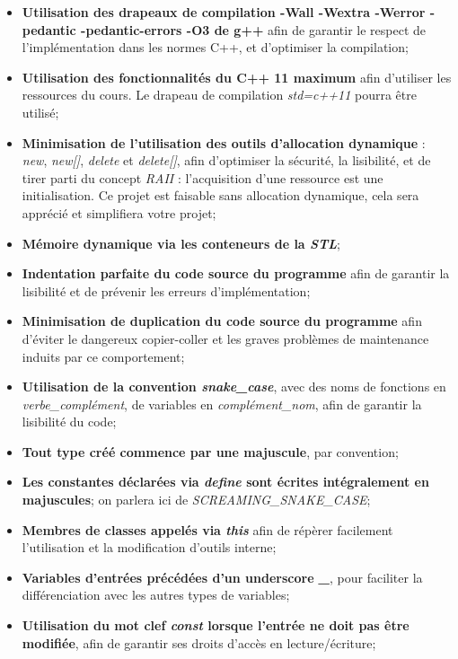 \documentclass[9pts]{article}
\begin{document}
\begin{itemize}
\item \textbf{Utilisation des drapeaux de compilation -Wall -Wextra -Werror -pedantic -pedantic-errors -O3 de g++} afin de garantir le respect de l'implémentation dans les normes C++, et d'optimiser la compilation;
\item \textbf{Utilisation des fonctionnalités du C++ 11 maximum} afin d'utiliser les ressources du cours. Le drapeau de compilation \emph{std=c++11} pourra être utilisé; %
\item \textbf{Minimisation de l'utilisation des outils d'allocation dynamique} : \emph{new}, \emph{new[]}, \emph{delete} et \emph{delete[]}, afin d'optimiser la sécurité, la lisibilité, et de tirer parti du concept \emph{RAII} : l'acquisition d'une ressource est une initialisation. Ce projet est faisable sans allocation dynamique, cela sera apprécié et simplifiera votre projet;
\item \textbf{Mémoire dynamique via les conteneurs de la \emph{STL}};
\item \textbf{Indentation parfaite du code source du programme} afin de garantir la lisibilité et de prévenir les erreurs d'implémentation;
\item \textbf{Minimisation de duplication du code source du programme} afin d'éviter le dangereux copier-coller et les graves problèmes de maintenance induits par ce comportement;
\item \textbf{Utilisation de la convention \emph{snake\_case}}, avec des noms de fonctions en \emph{verbe\_complément}, de variables en \emph{complément\_nom}, afin de garantir la lisibilité du code;
\item \textbf{Tout type créé commence par une majuscule}, par convention;
\item \textbf{Les constantes déclarées via \emph{define} sont écrites intégralement en majuscules}; on parlera ici de \emph{SCREAMING\_SNAKE\_CASE};
\item \textbf{Membres de classes appelés via \emph{this}} afin de répèrer facilement l'utilisation et la modification d'outils interne;
\item \textbf{Variables d'entrées précédées d'un underscore \emph{\_}}, pour faciliter la différenciation avec les autres types de variables;
\item \textbf{Utilisation du mot clef \emph{const} lorsque l'entrée ne doit pas être modifiée}, afin de garantir ses droits d'accès en lecture/écriture;

\end{itemize}
\end{document}
